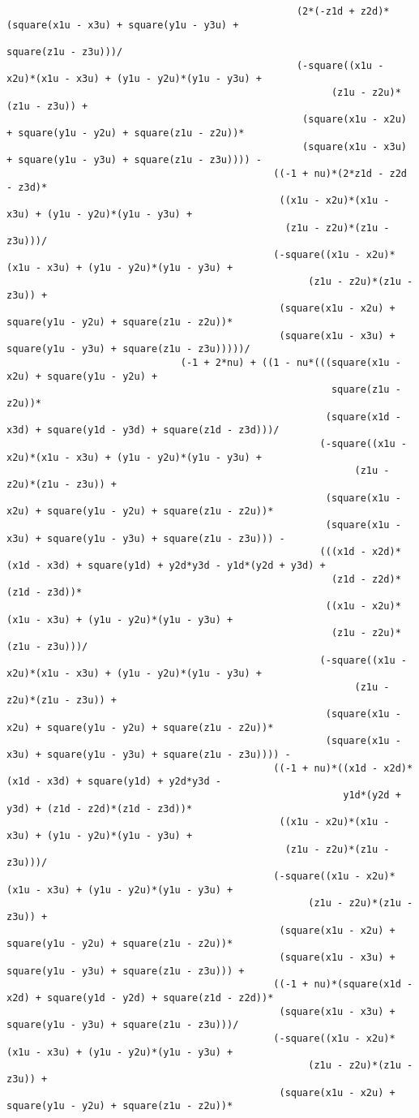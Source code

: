 \begin{lstlisting}
												  (2*(-z1d + z2d)*(square(x1u - x3u) + square(y1u - y3u) + 
																   square(z1u - z3u)))/
												  (-square((x1u - x2u)*(x1u - x3u) + (y1u - y2u)*(y1u - y3u) + 
														(z1u - z2u)*(z1u - z3u)) + 
												   (square(x1u - x2u) + square(y1u - y2u) + square(z1u - z2u))*
												   (square(x1u - x3u) + square(y1u - y3u) + square(z1u - z3u)))) - 
											  ((-1 + nu)*(2*z1d - z2d - z3d)*
											   ((x1u - x2u)*(x1u - x3u) + (y1u - y2u)*(y1u - y3u) + 
												(z1u - z2u)*(z1u - z3u)))/
											  (-square((x1u - x2u)*(x1u - x3u) + (y1u - y2u)*(y1u - y3u) + 
													(z1u - z2u)*(z1u - z3u)) + 
											   (square(x1u - x2u) + square(y1u - y2u) + square(z1u - z2u))*
											   (square(x1u - x3u) + square(y1u - y3u) + square(z1u - z3u)))))/
							  (-1 + 2*nu) + ((1 - nu*(((square(x1u - x2u) + square(y1u - y2u) + 
														square(z1u - z2u))*
													   (square(x1d - x3d) + square(y1d - y3d) + square(z1d - z3d)))/
													  (-square((x1u - x2u)*(x1u - x3u) + (y1u - y2u)*(y1u - y3u) + 
															(z1u - z2u)*(z1u - z3u)) + 
													   (square(x1u - x2u) + square(y1u - y2u) + square(z1u - z2u))*
													   (square(x1u - x3u) + square(y1u - y3u) + square(z1u - z3u))) - 
													  (((x1d - x2d)*(x1d - x3d) + square(y1d) + y2d*y3d - y1d*(y2d + y3d) + 
														(z1d - z2d)*(z1d - z3d))*
													   ((x1u - x2u)*(x1u - x3u) + (y1u - y2u)*(y1u - y3u) + 
														(z1u - z2u)*(z1u - z3u)))/
													  (-square((x1u - x2u)*(x1u - x3u) + (y1u - y2u)*(y1u - y3u) + 
															(z1u - z2u)*(z1u - z3u)) + 
													   (square(x1u - x2u) + square(y1u - y2u) + square(z1u - z2u))*
													   (square(x1u - x3u) + square(y1u - y3u) + square(z1u - z3u)))) - 
											  ((-1 + nu)*((x1d - x2d)*(x1d - x3d) + square(y1d) + y2d*y3d - 
														  y1d*(y2d + y3d) + (z1d - z2d)*(z1d - z3d))*
											   ((x1u - x2u)*(x1u - x3u) + (y1u - y2u)*(y1u - y3u) + 
												(z1u - z2u)*(z1u - z3u)))/
											  (-square((x1u - x2u)*(x1u - x3u) + (y1u - y2u)*(y1u - y3u) + 
													(z1u - z2u)*(z1u - z3u)) + 
											   (square(x1u - x2u) + square(y1u - y2u) + square(z1u - z2u))*
											   (square(x1u - x3u) + square(y1u - y3u) + square(z1u - z3u))) + 
											  ((-1 + nu)*(square(x1d - x2d) + square(y1d - y2d) + square(z1d - z2d))*
											   (square(x1u - x3u) + square(y1u - y3u) + square(z1u - z3u)))/
											  (-square((x1u - x2u)*(x1u - x3u) + (y1u - y2u)*(y1u - y3u) + 
													(z1u - z2u)*(z1u - z3u)) + 
											   (square(x1u - x2u) + square(y1u - y2u) + square(z1u - z2u))*

\end{lstlisting}
